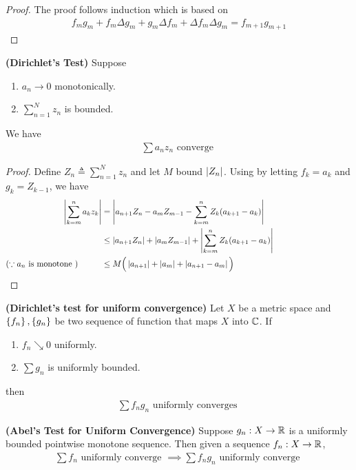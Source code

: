 \documentclass{report}
\begin{document}
\begin{proof}
The proof follows induction which is based on 
\begin{align*}
f_mg_m+ f_m\Delta g_m+ g_m \Delta f_m +\Delta f_m \Delta g_m=f_{m+1}g_{m+1}
\end{align*} 
\end{proof}
\begin{theorem}
\label{Dirichlet's Test}
\textbf{(Dirichlet's Test)} Suppose 
\begin{enumerate}[label=(\alph*)]
  \item $a_n\to 0$ monotonically. 
  \item $\sum_{n=1}^N z_n$ is bounded.
\end{enumerate}
We have 
\begin{align*}
\sum a_nz_n\text{ converge }
\end{align*}
\end{theorem}
\begin{proof}
Define $Z_n\triangleq \sum_{n=1}^N z_n$ and let $M$ bound  $\left|Z_n\right|$. Using  by letting $f_k=a_k$ and $g_k=Z_{k-1}$, we have
\begin{align*}
  \abso{\sum_{k=m}^{n}a_kz_k}&= \abso{a_{n+1}Z_n- a_mZ_{m-1}- \sum_{k=m}^n Z_k(a_{k+1}-a_k)}\\
                             &\leq \abso{a_{n+1}Z_n}+ \abso{a_mZ_{m-1}}+ \abso{\sum_{k=m}^n Z_k (a_{k+1}-a_k)}\\
  (\because a_n\text{ is monotone })\hspace{1cm}&\leq M\Big(\abso{a_{n+1}}+\abso{a_{m}}+\abso{a_{n+1}-a_m} \Big)\hspace{5cm}
\end{align*}
\end{proof}
\begin{theorem}
\label{THDtfuc}
\textbf{(Dirichlet's test for uniform convergence)} Let $X$ be a metric space and $\left\{ f_n \right\},\left\{ g_n \right\}$ be two sequence of function that maps $X$ into $\mathbb{C}$. If
\begin{enumerate}[label=(\roman*)]
  \item $f_n\searrow 0$ uniformly. 
  \item $\sum g_n$ is uniformly bounded. 
\end{enumerate}
then 
\begin{align*}
\sum f_ng_n\text{ uniformly converges }
\end{align*}
\end{theorem}
\begin{theorem}
\label{Abel's Test for Uniform Convergence}
\textbf{(Abel's Test for Uniform Convergence)} Suppose $g_n:X\rightarrow \mathbb{R}$ is a uniformly bounded pointwise monotone sequence. Then given a sequence $f_n:X\rightarrow \mathbb{R}$, 
\begin{align*}
\sum f_n\text{ uniformly converge }\implies \sum f_ng_n\text{ uniformly converge }
\end{align*}
\end{theorem}
\end{document}

